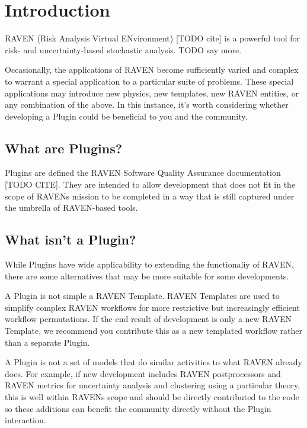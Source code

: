 \section{Introduction}

RAVEN (Risk Analysis Virtual ENvironment) [TODO cite] is a powerful tool for risk- and uncertainty-based stochastic analysis. TODO say more.

Occasionally, the applications of RAVEN become sufficiently varied and complex to warrant a special application to a particular suite of problems. These special applications may introduce new physics, new templates, new RAVEN entities, or any combination of the above. In this instance, it's worth considering whether developing a Plugin could be beneficial to you and the community.

\subsection{What are Plugins?}

Plugins are defined the RAVEN Software Quality Assurance documentation [TODO CITE]. They are intended to allow development that does not fit in the scope of RAVENs mission to be completed in a way that is still captured under the umbrella of RAVEN-based tools.

\subsection{What isn't a Plugin?}

While Plugins have wide applicability to extending the functionaliy of RAVEN, there are some alternatives that may be more suitable for some developments.

A Plugin is not simple a RAVEN Template. RAVEN Templates are used to simplify complex RAVEN workflows for more restrictive but increasingly efficient workflow permutations. If the end result of development is only a new RAVEN Template, we recommend you contribute this as a new templated workflow rather than a separate Plugin.

A Plugin is not a set of models that do similar activities to what RAVEN already does. For example, if new development includes RAVEN postprocessors and RAVEN metrics for uncertainty analysis and clustering using a particular theory, this is well within RAVENs scope and should be directly contributed to the code so these additions can benefit the community directly without the Plugin interaction.

